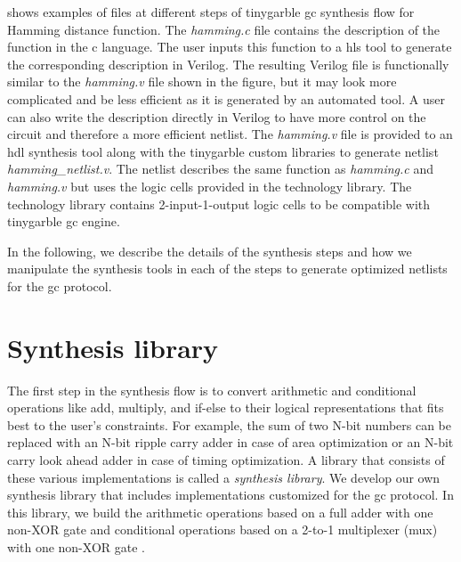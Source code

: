  shows examples of files at different steps of \gls{tinygarble} \acrshort{gc} synthesis flow for Hamming distance function.
The \textsl{hamming.c} file contains the description of the function in the \gls{c} language.
The user inputs this function to a \acrshort{hls} tool to generate the corresponding description in Verilog.
The resulting Verilog file is functionally similar to the \textsl{hamming.v} file shown in the figure, but it may look more complicated and be less efficient as it is generated by an automated tool.
A user can also write the description directly in Verilog to have more control on the circuit and therefore a more efficient netlist.
The \textsl{hamming.v} file is provided to an \acrshort{hdl} synthesis tool along with the \gls{tinygarble} custom libraries to generate netlist \textsl{hamming\_netlist.v}.
The netlist describes the same function as \textsl{hamming.c} and \textsl{hamming.v} but uses the logic cells provided in the technology library.
The technology library contains 2-input-1-output logic cells to be compatible with \gls{tinygarble} \acrshort{gc} engine.

In the following, we describe the details of the synthesis steps and how we manipulate the synthesis tools in each of the steps to generate optimized netlists for the \acrshort{gc} protocol.

\section{Synthesis library}\label{sec:syn-synlib}
The first step in the synthesis flow is to convert arithmetic and conditional operations like add, multiply, and if-else to their logical representations that fits best to the user's constraints.
For example, the sum of two N-bit numbers can be replaced with an N-bit ripple carry adder in case of area optimization or an N-bit carry look ahead adder in case of timing optimization.
A library that consists of these various implementations is called a \emph{synthesis library}.
We develop our own synthesis library that includes implementations customized for the \acrshort{gc} protocol.
In this library, we build the arithmetic operations based on a full adder with one non-XOR gate \cite{boyar2006concrete} and conditional operations based on a 2-to-1 multiplexer (\acrshort{mux}) with one non-XOR gate \cite{kolesnikov2008improved}.

